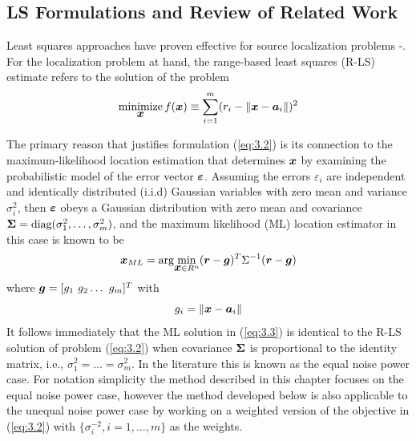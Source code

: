 \subsection{LS Formulations and Review of Related Work} %

Least squares approaches have proven effective for source localization problems \cite{SmithAbel} -\cite{BeckStLi}. For the localization problem at hand, the range-based least squares (R-LS) estimate refers to the solution of the problem
\begin{equation}\label{eq:3.2} %
\Min_{\Bx} f(\Bx) \equiv \sum_{i=1}^{m} (r_i - \|{\Bx} - {\Ba}_i\|)^2
\end{equation}

The primary reason that justifies formulation (\ref{eq:3.2}) is its connection to the maximum-likelihood location estimation that determines $\mbox{\boldmath$x$}$ by examining the probabilistic model of the error vector $\mbox{\boldmath${\varepsilon}$}$. Assuming the errors $\varepsilon_i$ are independent and identically distributed (i.i.d) Gaussian variables with zero mean and variance $\sigma_i^2$, then $\mbox{\boldmath${\varepsilon}$}$ obeys a Gaussian distribution with zero mean and covariance $\mbox{\boldmath${\Sigma}$} = \mbox{diag}(\sigma_1^2, \ldots, \sigma_m^2)$, and the maximum likelihood (ML) location estimator in this case is known to be
\begin{equation} \label{eq:3.3}%
\Bx_{ML} = \mbox{arg}\!\min_{{\Bx} \in R^n} (\Br - \Bg)^T\Sigma^{-1}(\Br - \Bg)
\end{equation}
where $\mbox{\boldmath$g$} = [g_1 \ g_2 \ldots \ g_m]^T$ with
\begin{equation} \label{eq:3.4}%
g_i = \|{\Bx} - {\Ba}_i\|
\end{equation}
It follows immediately that the ML solution in (\ref{eq:3.3}) is identical to the R-LS solution of problem (\ref{eq:3.2}) when covariance $\mbox{\boldmath${\Sigma}$}$ is proportional to the identity matrix, i.e., $\sigma_1^2=\ldots =\sigma_m^2$. In the literature this is known as the equal noise power case. For notation simplicity the method described in this chapter focuses on the equal noise power case, however the method developed below is also applicable to the unequal noise power case by working on a weighted version of the objective in  (\ref{eq:3.2})  with $\{\sigma_i^{-2}, i = 1, \ldots, m\}$ as the weights.

